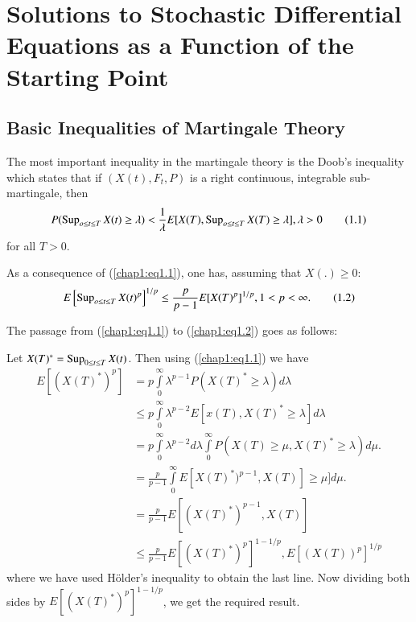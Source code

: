 
\chapter[Solutions to Stochastic Differential Equations....]{Solutions to Stochastic Differential Equations as a Function
  of the Starting Point}\label{chap1}%

\section{Basic Inequalities of Martingale Theory}\pageoriginale %

The most important inequality in the martingale theory is the Doob's
inequality which states that if $(X(t), F_t, P)$ is a right continuous,
integrable sub-martingale, then  
\begin{equation*}
P( \operatorname{Sup}_{o \leq t \leq T} X(t) \geq \lambda )< \frac{1}{\lambda}
E[X(T), \operatorname{Sup}_{o \leq t \leq T} X(T) \geq \lambda], \lambda>0
\tag{1.1}\label{chap1:eq1.1}  
\end{equation*}
for all $T> 0$.

As a consequence of (\ref{chap1:eq1.1}), one has, assuming that $X(.)
\geq 0$:  
\begin{equation*}
E \left[ \operatorname{Sup}_{o \leq t \leq T} X(t)^p \right]^{1/p} \leq
\frac{p}{p-1}E[X(T)^p]^{1/p}, 1 < p < \infty. \tag{1.2}\label{chap1:eq1.2}   
\end{equation*}

The passage from (\ref{chap1:eq1.1}) to (\ref{chap1:eq1.2}) goes as
follows: 

Let $X(T)^* = \operatorname{Sup}\limits_{0 \leq t \leq T} X(t)$. Then using
(\ref{chap1:eq1.1}) we have   
\begin{align*}
E[ (X(T)^*)^p] &= p \int\limits^{\infty}_0 \lambda^{p-1}P(X(T)^* \geq  
\lambda) d \lambda\\ 
& \leq  p \int \limits^{\infty}_0 \lambda^{p-2}E[x(T),X(T)^* \geq
  \lambda ] d \lambda\\ 
& = p \int \limits^{\infty}_0 \lambda^{p-2}d \lambda
\int\limits^{\infty}_0 P(X(T) \geq \mu,X(T)^* \geq \lambda)d \mu.\\  
& = \frac{p}{p-1}\int\limits^{\infty}_0 E[X(T)^*)^{p-1},X(T)] \geq
\mu] d \mu.\\ 
& = \frac{p}{p-1} E[(X(T)^*)^{p-1},X(T)]\\ 
& \leq
  \frac{p}{p-1}E[(X(T)^*)^p]^{1-1/p}, E[(X(T))^p]^{1/p}
\end{align*} 
where we have used H\"older's inequality to obtain the last line. Now
dividing both sides by $E[(X(T)^*)^{p}]^{1-1/p}$, we get the required
result. 
 
